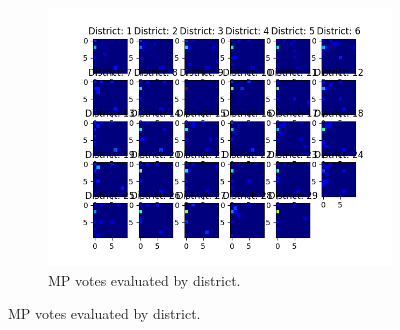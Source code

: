 \documentclass{article}
\begin{document}
\begin{figure}[ht!]
\begin{subfigure}[t]{\textwidth}
        \centering
        \includegraphics[width=1\textwidth]{plots/assignment_2/distr_votes_20_epochs.png}
        \caption{MP votes evaluated by district.}
    \end{subfigure}
\end{figure}


\end{document}
